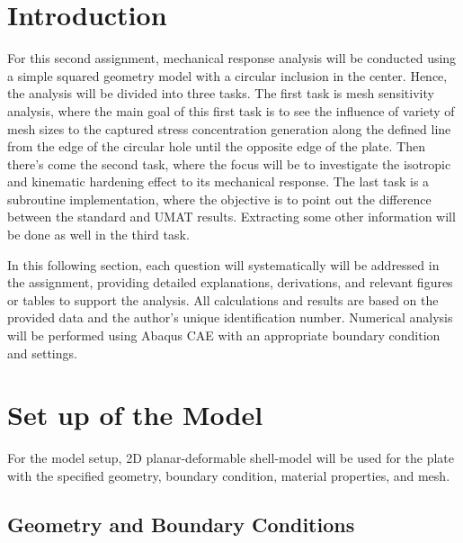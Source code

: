 \documentclass[12pt]{article}
\begin{document}
\section{Introduction}
\hspace*{2em}For this second assignment, mechanical response analysis will be conducted using a
simple squared geometry model with a circular inclusion in the center. Hence, the analysis will be 
divided into three tasks. The first task is mesh sensitivity analysis, where the main goal of this first 
task is to see the influence of variety of mesh sizes to the captured stress concentration generation along the defined line
from the edge of the circular hole until the opposite edge of the plate. Then there's 
come the second task, where the focus will be to investigate the isotropic and kinematic hardening 
effect to its mechanical response. The last task is a subroutine implementation, where the objective
is to point out the difference between the standard and UMAT results. Extracting some other information will be done 
as well in the third task. 

\hspace*{2em}In this following section, each question will systematically will be addressed in the assignment,
providing detailed explanations, derivations, and relevant figures or tables to support the
analysis. All calculations and results are based on the provided data and the author’s
unique identification number. Numerical analysis will be performed using Abaqus CAE
with an appropriate boundary condition and settings. 


\section{Set up of the Model}
\hspace*{2em}For the model setup, 2D planar-deformable shell-model will be used for the plate with the specified geometry, boundary condition, material properties, and mesh.  
\subsection{Geometry and Boundary Conditions}
\end{document}
